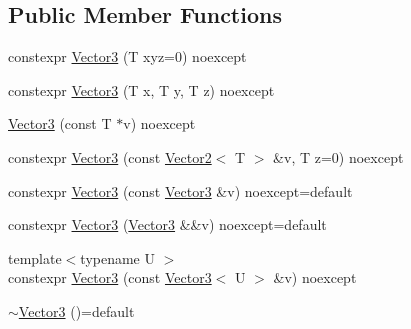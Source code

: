 \subsection*{Public Member Functions}
\begin{DoxyCompactItemize}
\item 
constexpr \hyperlink{structmage_1_1_vector3_3_01_t_00_01typename_01std_1_1enable__if__t_3_01std_1_1is__arithmetic__v_3_01_t_01_4_01_4_01_4_ad769054ca1f280fa81a23d0919c8e249}{Vector3} (T xyz=0) noexcept
\item 
constexpr \hyperlink{structmage_1_1_vector3_3_01_t_00_01typename_01std_1_1enable__if__t_3_01std_1_1is__arithmetic__v_3_01_t_01_4_01_4_01_4_a8e6d44a4319668f897c16fe9853f6242}{Vector3} (T x, T y, T z) noexcept
\item 
\hyperlink{structmage_1_1_vector3_3_01_t_00_01typename_01std_1_1enable__if__t_3_01std_1_1is__arithmetic__v_3_01_t_01_4_01_4_01_4_affe855e2a613491a3c02b2e9cdc7b831}{Vector3} (const T $\ast$v) noexcept
\item 
constexpr \hyperlink{structmage_1_1_vector3_3_01_t_00_01typename_01std_1_1enable__if__t_3_01std_1_1is__arithmetic__v_3_01_t_01_4_01_4_01_4_a8a708829966c97f811912691eb1ed6b0}{Vector3} (const \hyperlink{structmage_1_1_vector2}{Vector2}$<$ T $>$ \&v, T z=0) noexcept
\item 
constexpr \hyperlink{structmage_1_1_vector3_3_01_t_00_01typename_01std_1_1enable__if__t_3_01std_1_1is__arithmetic__v_3_01_t_01_4_01_4_01_4_a565856dc1f32df45f91bd9568d1a4ce0}{Vector3} (const \hyperlink{structmage_1_1_vector3}{Vector3} \&v) noexcept=default
\item 
constexpr \hyperlink{structmage_1_1_vector3_3_01_t_00_01typename_01std_1_1enable__if__t_3_01std_1_1is__arithmetic__v_3_01_t_01_4_01_4_01_4_af650c13f7b0d3c3cf3a6f967a05b7f65}{Vector3} (\hyperlink{structmage_1_1_vector3}{Vector3} \&\&v) noexcept=default
\item 
{\footnotesize template$<$typename U $>$ }\\constexpr \hyperlink{structmage_1_1_vector3_3_01_t_00_01typename_01std_1_1enable__if__t_3_01std_1_1is__arithmetic__v_3_01_t_01_4_01_4_01_4_af64154c4a951cc762b2ae7708f151588}{Vector3} (const \hyperlink{structmage_1_1_vector3}{Vector3}$<$ U $>$ \&v) noexcept
\item 
\hyperlink{structmage_1_1_vector3_3_01_t_00_01typename_01std_1_1enable__if__t_3_01std_1_1is__arithmetic__v_3_01_t_01_4_01_4_01_4_a0111ac581a7261efb8df26f39880a502}{$\sim$\+Vector3} ()=default
\item 

\end{DoxyCompactItemize}
